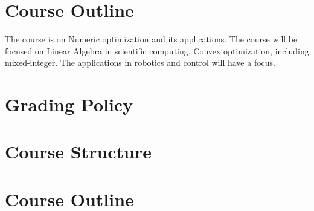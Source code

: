 \documentclass[11pt,a4paper]{article}
\begin{document}
%

\section{Course Outline}
The course is on Numeric optimization and its applications. The course will be focused on Linear Algebra in scientific computing, Convex optimization, including mixed-integer. The applications in robotics and control will have a focus. 

\section{Grading Policy}


\section{Course Structure}


\section{Course Outline}

\end{document}
